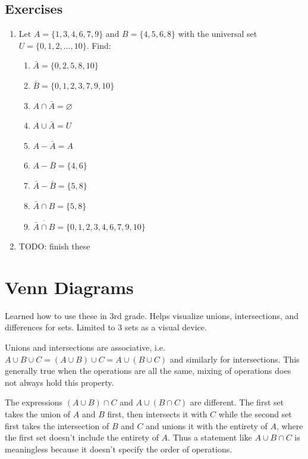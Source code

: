 \documentclass[10pt]{article}
\theoremstyle{definition}
\begin{document}
    \subsection*{Exercises}
    \begin{enumerate}
        \item Let $A =\{1,3,4,6,7,9\}$ and $B =\{4,5,6,8\}$ with the universal set $U = \{0,1,2,\dots,10\}$. Find:
            \begin{enumerate}[label=(\alph*)]
                \item $\bar A = \{0,2,5,8,10\}$
                \item $\bar B = \{0,1,2,3,7,9,10\}$
                \item $A \cap \bar A = \varnothing$
                \item $A \cup \bar A = U$
                \item $A - \bar A = A$
                \item $A - \bar B =\{4,6\}$
                \item $\bar A - \bar B = \{5,8\}$
                \item $\bar A \cap B = \{5,8\}$
                \item $\overline{\bar{A} \cap B} = \{0,1,2,3,4,6,7,9,10\}$
            \end{enumerate}
        \item TODO: finish these
    \end{enumerate}

    \section{Venn Diagrams}

    Learned how to use these in 3rd grade. Helps visualize unions, intersections, and differences for sets. Limited to 3 sets as a visual device.

    Unions and intersections are associative, i.e. $A \cup B \cup C = (A \cup B) \cup C = A \cup (B \cup C)$ and similarly for intersections. This generally true when the operations are all the same, mixing of operations does not always hold this property.

    The expressions $(A \cup B) \cap C$ and $A \cup (B \cap C)$ are different. The first set takes the union of $A$ and $B$ first, then intersects it with $C$ while the second set first takes the intersection of $B$ and $C$ and unions it with the entirety of $A$, where the first set doesn't include the entirety of $A$. Thus a statement like $A \cup B \cap C$ is meaningless because it doesn't specify the order of operations.
\end{document}
